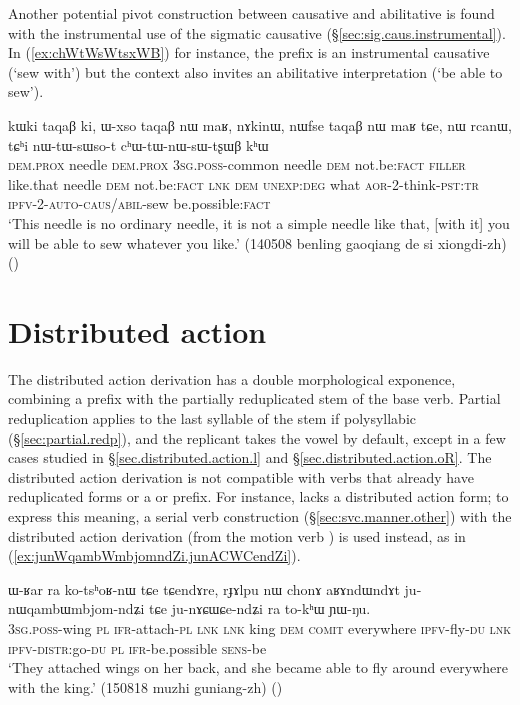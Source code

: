 Another potential pivot construction between causative and abilitative is found with the instrumental use of the sigmatic causative (§\ref{sec:sig.caus.instrumental}). In (\ref{ex:chWtWsWtsxWB}) for instance, the  prefix is an instrumental causative (`sew with') but the context also invites an abilitative interpretation (`be able to sew').

\begin{exe}
\ex \label{ex:chWtWsWtsxWB}
\gll  kɯki taqaβ ki, ɯ-xso taqaβ nɯ maʁ, nɤkinɯ, nɯfse taqaβ nɯ maʁ tɕe, nɯ rcanɯ, tɕʰi nɯ-tɯ-sɯso-t cʰɯ-tɯ-nɯ-sɯ-tʂɯβ kʰɯ  \\
\textsc{dem}.\textsc{prox} needle \textsc{dem}.\textsc{prox} \textsc{3sg}.\textsc{poss}-common needle \textsc{dem} not.be:\textsc{fact} \textsc{filler} like.that needle \textsc{dem} not.be:\textsc{fact} \textsc{lnk} \textsc{dem} \textsc{unexp}:\textsc{deg} what \textsc{aor}-2-think-\textsc{pst}:\textsc{tr} \textsc{ipfv}-2-\textsc{auto}-\textsc{caus/abil}-sew be.possible:\textsc{fact} \\
\glt `This needle is no ordinary needle, it is not a simple needle like that, [with it] you will be able to sew whatever you like.' (140508 benling gaoqiang de si xiongdi-zh)
()
\end{exe}
   
\section{Distributed action} \label{sec:distributed.action} 
The distributed action derivation has a double morphological exponence, combining a prefix  with the partially reduplicated stem of the base verb. Partial reduplication applies to the last syllable of the stem if polysyllabic (§\ref{sec:partial.redp}), and the replicant takes the vowel  by default, except in a few cases studied in §\ref{sec.distributed.action.l} and §\ref{sec.distributed.action.oR}. The distributed action derivation is not compatible with verbs that already have reduplicated forms or a  or  prefix. For instance,  lacks a distributed action form; to express this meaning, a serial verb construction (§\ref{sec:svc.manner.other}) with the distributed action derivation   (from the motion verb ) is used instead, as in (\ref{ex:junWqambWmbjomndZi.junACWCendZi}).

\begin{exe}
\ex \label{ex:junWqambWmbjomndZi.junACWCendZi}
\gll  ɯ-ʁar ra ko-tsʰoʁ-nɯ tɕe tɕendɤre, rɟɤlpu nɯ chonɤ aʁɤndɯndɤt ju-nɯqambɯmbjom-ndʑi tɕe ju-nɤɕɯɕe-ndʑi ra to-kʰɯ ɲɯ-ŋu. \\
\textsc{3sg}.\textsc{poss}-wing \textsc{pl} \textsc{ifr}-attach-\textsc{pl} \textsc{lnk} \textsc{lnk} king \textsc{dem} \textsc{comit} everywhere \textsc{ipfv}-fly-\textsc{du} \textsc{lnk} \textsc{ipfv}-\textsc{distr}:go-\textsc{du} \textsc{pl} \textsc{ifr}-be.possible \textsc{sens}-be \\
\glt `They attached wings on her back, and she became able to fly around everywhere with the king.' (150818 muzhi guniang-zh)
()
\end{exe}


